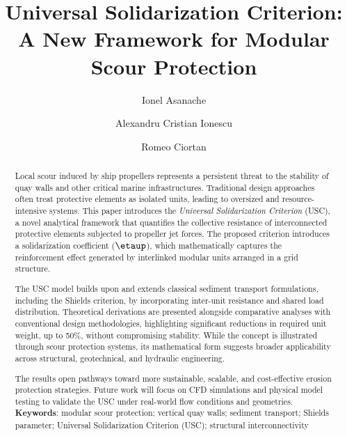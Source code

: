 \documentclass[Journal,letterpaper]{ascelike-new}
\begin{document}
\title{Universal Solidarization Criterion: A New Framework for Modular Scour Protection}

\author[1]{Ionel Asanache}
\author[2]{Alexandru Cristian Ionescu}
\author[3]{Romeo Ciortan}


\maketitle

\begin{abstract}
Local scour induced by ship propellers represents a persistent threat to the stability of quay walls and other critical marine infrastructures. Traditional design approaches often treat protective elements as isolated units, leading to oversized and resource-intensive systems. This paper introduces the \textit{Universal Solidarization Criterion} (USC), a novel analytical framework that quantifies the collective resistance of interconnected protective elements subjected to propeller jet forces. The proposed criterion introduces a solidarization coefficient ($\etaup$), which mathematically captures the reinforcement effect generated by interlinked modular units arranged in a grid structure.

The USC model builds upon and extends classical sediment transport formulations, including the Shields criterion, by incorporating inter-unit resistance and shared load distribution. Theoretical derivations are presented alongside comparative analyses with conventional design methodologies, highlighting significant reductions in required unit weight, up to 50\%, without compromising stability. While the concept is illustrated through scour protection systems, its mathematical form suggests broader applicability across structural, geotechnical, and hydraulic engineering.

The results open pathways toward more sustainable, scalable, and cost-effective erosion protection strategies. Future work will focus on CFD simulations and physical model testing to validate the USC under real-world flow conditions and geometries.\\
\textbf{Keywords}: modular scour protection; vertical quay walls; sediment transport; Shields parameter; Universal Solidarization Criterion (USC); structural interconnectivity
\end{abstract}
\end{document}
